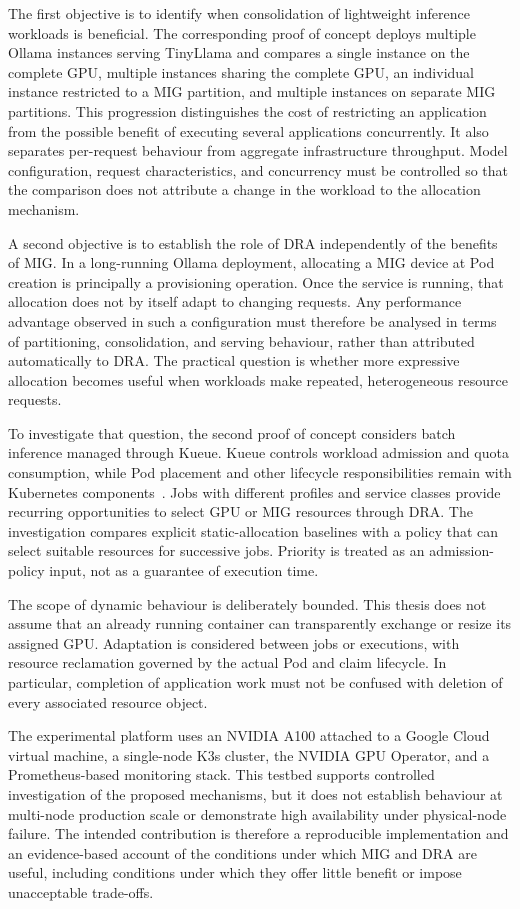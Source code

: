 The first objective is to identify when consolidation of lightweight inference workloads is beneficial. The corresponding proof of concept deploys multiple Ollama instances serving TinyLlama and compares a single instance on the complete GPU, multiple instances sharing the complete GPU, an individual instance restricted to a MIG partition, and multiple instances on separate MIG partitions. This progression distinguishes the cost of restricting an application from the possible benefit of executing several applications concurrently. It also separates per-request behaviour from aggregate infrastructure throughput. Model configuration, request characteristics, and concurrency must be controlled so that the comparison does not attribute a change in the workload to the allocation mechanism.

A second objective is to establish the role of DRA independently of the benefits of MIG. In a long-running Ollama deployment, allocating a MIG device at Pod creation is principally a provisioning operation. Once the service is running, that allocation does not by itself adapt to changing requests. Any performance advantage observed in such a configuration must therefore be analysed in terms of partitioning, consolidation, and serving behaviour, rather than attributed automatically to DRA. The practical question is whether more expressive allocation becomes useful when workloads make repeated, heterogeneous resource requests.

To investigate that question, the second proof of concept considers batch inference managed through Kueue. Kueue controls workload admission and quota consumption, while Pod placement and other lifecycle responsibilities remain with Kubernetes components~\cite{kueue2026overview}. Jobs with different profiles and service classes provide recurring opportunities to select GPU or MIG resources through DRA. The investigation compares explicit static-allocation baselines with a policy that can select suitable resources for successive jobs. Priority is treated as an admission-policy input, not as a guarantee of execution time.

The scope of dynamic behaviour is deliberately bounded. This thesis does not assume that an already running container can transparently exchange or resize its assigned GPU. Adaptation is considered between jobs or executions, with resource reclamation governed by the actual Pod and claim lifecycle. In particular, completion of application work must not be confused with deletion of every associated resource object.

The experimental platform uses an NVIDIA A100 attached to a Google Cloud virtual machine, a single-node K3s cluster, the NVIDIA GPU Operator, and a Prometheus-based monitoring stack. This testbed supports controlled investigation of the proposed mechanisms, but it does not establish behaviour at multi-node production scale or demonstrate high availability under physical-node failure. The intended contribution is therefore a reproducible implementation and an evidence-based account of the conditions under which MIG and DRA are useful, including conditions under which they offer little benefit or impose unacceptable trade-offs.

